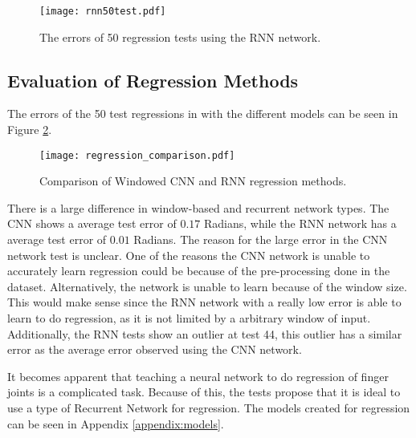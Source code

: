\documentclass[../main.tex]{subfiles}
\begin{document}
\begin{figure}[H]
\begin{center}
\texttt{[image: rnn50test.pdf]}
\caption{The errors of 50 regression tests using the RNN network.}
\label{fig:rnntest}
\end{center}
\end{figure}

\newpage
\subsection{Evaluation of Regression Methods}

The errors of the 50 test regressions in with the different models can be seen in Figure \ref{fig:regression_comp}.

\begin{figure}[h]
\begin{center}
\texttt{[image: regression\_comparison.pdf]}
\caption{Comparison of Windowed CNN and RNN regression methods.}
\label{fig:regression_comp}
\end{center}
\end{figure}

There is a large difference in window-based and recurrent network types.
The CNN shows a average test error of $0.17$ Radians, while the RNN network has a average test error of $0.01$ Radians. 
The reason for the large error in the CNN network test is unclear.
One of the reasons the CNN network is unable to accurately learn regression could be because of the pre-processing done in the dataset.
Alternatively, the network is unable to learn because of the window size. This would make sense since the RNN network with a really low error is able to learn to do regression, as it is not limited by a arbitrary window of input.
Additionally, the RNN tests show an outlier at test 44, this outlier has a similar error as the average error observed using the CNN network.

It becomes apparent that teaching a neural network to do regression of finger joints is a complicated task.
Because of this, the tests propose that it is ideal to use a type of Recurrent Network for regression.
The models created for regression can be seen in Appendix \ref{appendix:models}.

\end{document}
